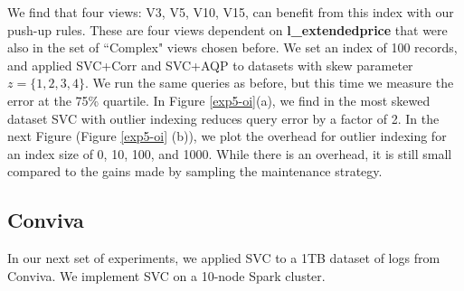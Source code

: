 We find that four views: V3, V5, V10, V15, can benefit from this index with our push-up rules. 
These are four views dependent on \textbf{l\_extendedprice} that were also in the set of ``Complex" views chosen before.
We set an index of 100 records, and applied SVC+Corr and SVC+AQP to datasets with skew parameter $z=\{1,2,3,4\}$. 
We run the same queries as before, but this time we measure the error at the 75\% quartile.
In Figure \ref{exp5-oi}(a), we find in the most skewed dataset SVC with outlier indexing reduces query error by a factor of 2.
In the next Figure \big(Figure \ref{exp5-oi} (b)\big), we plot the overhead for outlier indexing for an index size of 0, 10, 100, and 1000.
While there is an overhead, it is still small compared to the gains made by sampling the maintenance strategy.

\subsection{Conviva}
In our next set of experiments, we applied SVC to a 1TB dataset of logs from Conviva.
We implement SVC on a 10-node Spark cluster. 

